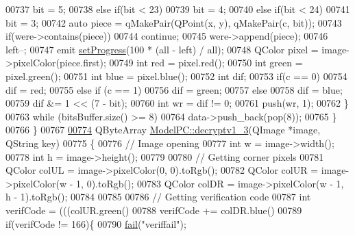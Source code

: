 \begin{DoxyCode}
00737                 bit = 5;
00738             \textcolor{keywordflow}{else} \textcolor{keywordflow}{if}(bit < 23)
00739                 bit = 4;
00740             \textcolor{keywordflow}{else} \textcolor{keywordflow}{if}(bit < 24)
00741                 bit = 3;
00742             \textcolor{keyword}{auto} piece = qMakePair(QPoint(x, y), qMakePair(c, bit));
00743             \textcolor{keywordflow}{if}(were->contains(piece))
00744                 \textcolor{keywordflow}{continue};
00745             were->append(piece);
00746             left--;
00747             emit \hyperlink{class_model_p_c_afdcd80f0ed5062e145a71f09b0897547}{setProgress}(100 * (all - left) / all);
00748             QColor pixel = image->pixelColor(piece.first);
00749             \textcolor{keywordtype}{int} red = pixel.red();
00750             \textcolor{keywordtype}{int} green = pixel.green();
00751             \textcolor{keywordtype}{int} blue = pixel.blue();
00752             \textcolor{keywordtype}{int} dif;
00753             \textcolor{keywordflow}{if}(c == 0)
00754                 dif = red;
00755             \textcolor{keywordflow}{else} \textcolor{keywordflow}{if} (c == 1)
00756                 dif = green;
00757             \textcolor{keywordflow}{else}
00758                 dif = blue;
00759             dif &= 1 << (7 - bit);
00760             \textcolor{keywordtype}{int} wr = dif != 0;
00761             push(wr, 1);
00762         \}
00763         \textcolor{keywordflow}{while} (bitsBuffer.size() >= 8)
00764             data->push\_back(pop(8));
00765     \}
00766 \}
00767 
\hypertarget{modelpc_8cpp_source_l00774}{}\hyperlink{class_model_p_c_a4fe70ebbedfaf31d45a35f82d0f06caa}{00774} QByteArray \hyperlink{class_model_p_c_a4fe70ebbedfaf31d45a35f82d0f06caa}{ModelPC::decryptv1\_3}(QImage *image, QString key)
00775 \{
00776     \textcolor{comment}{// Image opening}
00777     \textcolor{keywordtype}{int} w = image->width();
00778     \textcolor{keywordtype}{int} h = image->height();
00779 
00780     \textcolor{comment}{// Getting corner pixels}
00781     QColor colUL = image->pixelColor(0, 0).toRgb();
00782     QColor colUR = image->pixelColor(w - 1, 0).toRgb();
00783     QColor colDR = image->pixelColor(w - 1, h - 1).toRgb();
00784 
00785 
00786     \textcolor{comment}{// Getting verification code}
00787     \textcolor{keywordtype}{int} verifCode = (((colUR.green() %
00788     verifCode += colDR.blue() %
00789     \textcolor{keywordflow}{if}(verifCode != 166)\{
00790         \hyperlink{class_model_p_c_a47464b59b7e37fcee25e55475708aabd}{fail}(\textcolor{stringliteral}{"veriffail"});

\end{DoxyCode}
